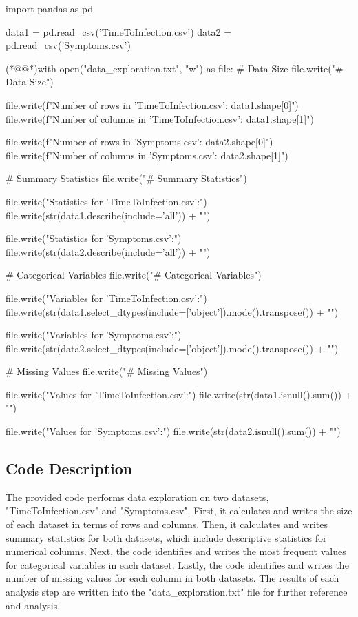 \documentclass[11pt]{article}
\begin{document}
\begin{python}

import pandas as pd

data1 = pd.read_csv('TimeToInfection.csv')
data2 = pd.read_csv('Symptoms.csv')

(*@@*)with open("data_exploration.txt", "w") as file:
    # Data Size
    file.write("# Data Size\n")
    
    file.write(f"Number of rows in 'TimeToInfection.csv': {data1.shape[0]}\n")
    file.write(f"Number of columns in 'TimeToInfection.csv': {data1.shape[1]}\n")

    file.write(f"Number of rows in 'Symptoms.csv': {data2.shape[0]}\n")
    file.write(f"Number of columns in 'Symptoms.csv': {data2.shape[1]}\n")


    # Summary Statistics
    file.write("\n# Summary Statistics\n")
    
    file.write("\nSummary Statistics for 'TimeToInfection.csv':\n")
    file.write(str(data1.describe(include='all')) + "\n")

    file.write("\nSummary Statistics for 'Symptoms.csv':\n")
    file.write(str(data2.describe(include='all')) + "\n")


    # Categorical Variables
    file.write("\n# Categorical Variables\n")
    
    file.write("\nCategorical Variables for 'TimeToInfection.csv':\n")
    file.write(str(data1.select_dtypes(include=['object']).mode().transpose()) + "\n")

    file.write("\nCategorical Variables for 'Symptoms.csv':\n")
    file.write(str(data2.select_dtypes(include=['object']).mode().transpose()) + "\n")


    # Missing Values
    file.write("\n# Missing Values\n")
    
    file.write("\nMissing Values for 'TimeToInfection.csv':\n")
    file.write(str(data1.isnull().sum()) + "\n")

    file.write("\nMissing Values for 'Symptoms.csv':\n")
    file.write(str(data2.isnull().sum()) + "\n")

\end{python}

\subsection{Code Description}

The provided code performs data exploration on two datasets, "TimeToInfection.csv" and "Symptoms.csv". 
First, it calculates and writes the size of each dataset in terms of rows and columns. 
Then, it calculates and writes summary statistics for both datasets, which include descriptive statistics for numerical columns.
Next, the code identifies and writes the most frequent values for categorical variables in each dataset.
Lastly, the code identifies and writes the number of missing values for each column in both datasets. 
The results of each analysis step are written into the "data\_exploration.txt" file for further reference and analysis.
\end{document}
